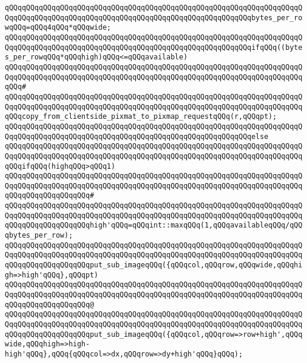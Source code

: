 \verb|qQQqqQQqqQQqqQQqqQQqqQQqqQQqqQQqqQQqqQQqqQQqqQQqqQQqqQQqqQQqqQQqqQQqqQQqqQQqqQQqqQQqqQQqqQQqqQQqqQQqqQQqqQQqqQQqqQQqqQQqqQQqqQQqbytes_per_rowqQQq=qQQq4qQQq*qQQqwide;|\newline
\newline
\verb|qQQqqQQqqQQqqQQqqQQqqQQqqQQqqQQqqQQqqQQqqQQqqQQqqQQqqQQqqQQqqQQqqQQqqQQqqQQqqQQqqQQqqQQqqQQqqQQqqQQqqQQqqQQqqQQqqQQqqQQqqQQqqQQqifqQQq((bytes_per_rowqQQq*qQQqhigh)qQQq<=qQQqavailable)|\newline
\verb|qQQqqQQqqQQqqQQqqQQqqQQqqQQqqQQqqQQqqQQqqQQqqQQqqQQqqQQqqQQqqQQqqQQqqQQqqQQqqQQqqQQqqQQqqQQqqQQqqQQqqQQqqQQqqQQqqQQqqQQqqQQqqQQqqQQqqQQqqQQqqQQq#|\newline
\verb|qQQqqQQqqQQqqQQqqQQqqQQqqQQqqQQqqQQqqQQqqQQqqQQqqQQqqQQqqQQqqQQqqQQqqQQqqQQqqQQqqQQqqQQqqQQqqQQqqQQqqQQqqQQqqQQqqQQqqQQqqQQqqQQqqQQqqQQqqQQqqQQqcopy_from_clientside_pixmat_to_pixmap_requestqQQq(r,qQQqpt);|\newline
\verb|qQQqqQQqqQQqqQQqqQQqqQQqqQQqqQQqqQQqqQQqqQQqqQQqqQQqqQQqqQQqqQQqqQQqqQQqqQQqqQQqqQQqqQQqqQQqqQQqqQQqqQQqqQQqqQQqqQQqqQQqqQQqqQQqelse|\newline
\verb|qQQqqQQqqQQqqQQqqQQqqQQqqQQqqQQqqQQqqQQqqQQqqQQqqQQqqQQqqQQqqQQqqQQqqQQqqQQqqQQqqQQqqQQqqQQqqQQqqQQqqQQqqQQqqQQqqQQqqQQqqQQqqQQqqQQqqQQqqQQqqQQqifqQQq(highqQQq>qQQq1)|\newline
\verb|qQQqqQQqqQQqqQQqqQQqqQQqqQQqqQQqqQQqqQQqqQQqqQQqqQQqqQQqqQQqqQQqqQQqqQQqqQQqqQQqqQQqqQQqqQQqqQQqqQQqqQQqqQQqqQQqqQQqqQQqqQQqqQQqqQQqqQQqqQQqqQQqqQQqqQQqqQQqqQQq#|\newline
\verb|qQQqqQQqqQQqqQQqqQQqqQQqqQQqqQQqqQQqqQQqqQQqqQQqqQQqqQQqqQQqqQQqqQQqqQQqqQQqqQQqqQQqqQQqqQQqqQQqqQQqqQQqqQQqqQQqqQQqqQQqqQQqqQQqqQQqqQQqqQQqqQQqqQQqqQQqqQQqqQQqhigh'qQQq=qQQqint::maxqQQq(1,qQQqavailableqQQq/qQQqbytes_per_row);|\newline
\newline
\verb|qQQqqQQqqQQqqQQqqQQqqQQqqQQqqQQqqQQqqQQqqQQqqQQqqQQqqQQqqQQqqQQqqQQqqQQqqQQqqQQqqQQqqQQqqQQqqQQqqQQqqQQqqQQqqQQqqQQqqQQqqQQqqQQqqQQqqQQqqQQqqQQqqQQqqQQqqQQqqQQqput_sub_imageqQQq({qQQqcol,qQQqrow,qQQqwide,qQQqhigh=>high'qQQq},qQQqpt)|\newline
\verb|qQQqqQQqqQQqqQQqqQQqqQQqqQQqqQQqqQQqqQQqqQQqqQQqqQQqqQQqqQQqqQQqqQQqqQQqqQQqqQQqqQQqqQQqqQQqqQQqqQQqqQQqqQQqqQQqqQQqqQQqqQQqqQQqqQQqqQQqqQQqqQQqqQQqqQQqqQQqqQQq@|\newline
\verb|qQQqqQQqqQQqqQQqqQQqqQQqqQQqqQQqqQQqqQQqqQQqqQQqqQQqqQQqqQQqqQQqqQQqqQQqqQQqqQQqqQQqqQQqqQQqqQQqqQQqqQQqqQQqqQQqqQQqqQQqqQQqqQQqqQQqqQQqqQQqqQQqqQQqqQQqqQQqqQQqput_sub_imageqQQq({qQQqcol,qQQqrow=>row+high',qQQqwide,qQQqhigh=>high-high'qQQq},qQQq{qQQqcol=>dx,qQQqrow=>dy+high'qQQq}qQQq);|\newline
